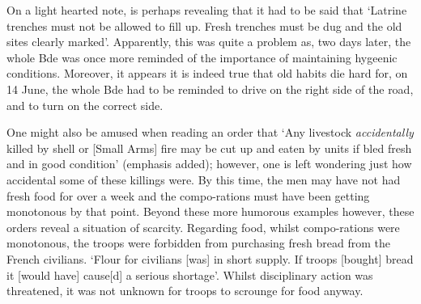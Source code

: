 \documentclass[noraggedright]{turabian-researchpaper}
\begin{document}
On a light hearted note, is perhaps revealing that it had to be said that 
`Latrine trenches must
not be allowed to fill up.  Fresh trenches must be dug and the old sites
clearly marked'.\autocite[June Adm Order No. 3][Para 10]{27wd}  Apparently,
this was quite a problem as, two days later, the whole Bde was once more 
reminded of the importance of maintaining hygeenic conditions.\autocite
[June Adm Order No. 4, Para 1a]{27wd}  
Moreover, it appears it is indeed true that old habits die hard for, 
on 14 June, the whole Bde had to be reminded to drive on the right side of 
the road, and to turn on the correct side.\autocite[June Adm Order No. 1]
[Para 9] {27wd}  

One might also be amused when reading an order that `Any 
livestock \textit{accidentally} killed by shell or [Small Arms] fire may be 
cut up and eaten by units if bled fresh and in good condition' (emphasis 
added); however, one is left wondering just how accidental some of these 
killings were.\autocite[June Adm Order No. 1][Para 10]{27wd}  By this time, 
the men may have not had fresh food for over a week and the compo-rations 
must have been getting monotonous by that point.
Beyond these more humorous examples however, these orders reveal a 
situation of scarcity.  Regarding food, whilst compo-rations were 
monotonous, the troops were forbidden from purchasing fresh bread from the
French civilians.  `Flour for civilians [was] in short supply.  If troops 
[bought] bread it [would have] cause[d] a serious shortage'.\autocite
[June Adm Order No. 2.][Para 1]{27wd}  Whilst disciplinary action was 
threatened, it was not unknown for troops to scrounge for food anyway.
\end{document}
